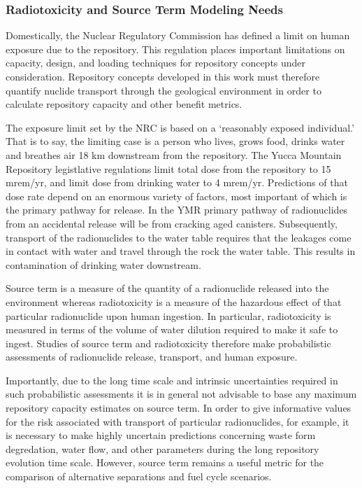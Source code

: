 \subsubsection{Radiotoxicity and Source Term Modeling Needs}

Domestically, the Nuclear Regulatory Commission has defined a limit on  
human exposure due to the repository. This regulation places important 
limitations on capacity, design, and loading techniques for repository 
concepts under consideration. Repository concepts developed in this 
work must therefore quantify nuclide transport through the geological 
environment in order to calculate repository capacity and other 
benefit metrics. 

The exposure limit set by the NRC is based on a `reasonably exposed 
individual.' That is to say, the limiting case is a person who lives, 
grows food, drinks water and breathes air 18 km downstream from the 
repository. The Yucca Mountain Repository legistlative regulations 
limit total dose from the repository to 15 mrem/yr, and limit dose 
from drinking water to 4 mrem/yr.  Predictions of that dose rate 
depend on an enormous variety of factors, most important of which is 
the primary pathway for release. In the \gls{YMR} primary pathway of 
radionuclides from an accidental release will be from cracking aged 
canisters. Subsequently, transport of the radionuclides to the water 
table requires that the leakages come in contact with water and travel 
through the rock the water table. This results in contamination of 
drinking water downstream.  

Source term is a measure of the quantity of a radionuclide released 
into the environment whereas radiotoxicity is a measure of the 
hazardous effect of that particular radionuclide upon human ingestion.  
In particular, radiotoxicity is measured in terms of the volume of 
water dilution required to make it safe to ingest. Studies of source 
term and radiotoxicity therefore make probabilistic assessments of 
radionuclide release, transport, and human exposure.  

Importantly, due to the long time scale and intrinsic uncertainties 
required in such probabilistic assessments it is in general not 
advisable to base any maximum repository capacity estimates on source 
term.
In order to give informative values for the risk associated with 
transport of particular radionuclides, for example, it is necessary to 
make highly uncertain  predictions concerning waste form degredation, 
water flow, and other parameters during the long repository evolution 
time scale.  However, source term remains a useful metric for the comparison 
of alternative separations and fuel cycle scenarios.

